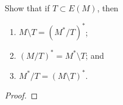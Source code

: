 \prob
{
	Show that if $T \subset E(M)$, then\pn
	\begin{enumerate}[label=(\roman*)]
		\item $M \setminus T = (M^* / T)^*$;
		\item $(M / T)^* = M^* \setminus T$; and
		\item $M^* / T = (M \setminus T)^*$.
	\end{enumerate}
}
\begin{proof}
\end{proof}